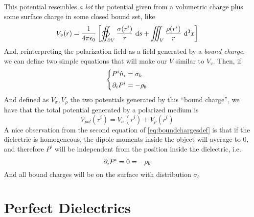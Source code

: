\documentclass[../electromagnetism]{subfiles}
\begin{document}
This potential resembles \emph{a lot} the potential given from a volumetric charge plus some surface charge in some closed bound set, like
\begin{equation*}
	V_{v}(r)=\frac{1}{4\pi\epsilon_0}\left[ \oiint_{\partial V}\frac{\sigma(r^i)}{r}\ \mathrm{d} s+\iiint_V\frac{\rho(r^i)}{r}\ \mathrm{d}^3x \right]
\end{equation*}
And, reinterpreting the polarization field as a field generated by a \textit{bound charge}, we can define two simple equations that will make our $V$ similar to $V_v$. Then, if
\begin{equation}
	\left\{ \begin{aligned}
			P^i\hat{n}_i&=\sigma_b\\
			\partial_iP^i&=-\rho_b
	\end{aligned}\right.
	\label{eq:boundchargesdef}
\end{equation}
And defined as $V_{\sigma},V_{\rho}$ the two potentials generated by this ``bound charge'', we have that the total potential generated by a polarized medium is
\begin{equation}
	V_{pol}(r^i)=V_\sigma(r^i)+V_\rho(r^i)
	\label{eq:polfieldpot}
\end{equation}
A nice observation from the second equation of \eqref{eq:boundchargesdef} is that if the dielectric is homogeneous, the dipole moments inside the object will average to 0, and therefore $P^i$ will be independent from the position inside the dielectric, i.e.
\begin{equation*}
	\partial_iP^i=0=-\rho_b
\end{equation*}
And all bound charges will be on the surface with distribution $\sigma_b$
\section{Perfect Dielectrics}
\end{document}
